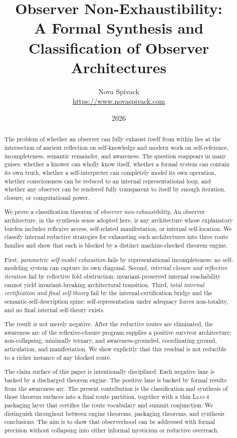 \documentclass[11pt]{article}
\title{Observer Non-Exhaustibility:\\
A Formal Synthesis and Classification of Observer Architectures}
\author{Nova Spivack\\
\url{https://www.novaspivack.com}}
\date{2026}
\theoremstyle{plain}
\theoremstyle{definition}
\theoremstyle{remark}
\newcommand{\Lean}{\textsc{Lean\,4}}
\begin{document}
\maketitle
\NovaZenodoAfterTitle


\begin{abstract}
\raggedright
The problem of whether an observer can fully exhaust itself from within
lies at the intersection of ancient reflection on self-knowledge and
modern work on self-reference, incompleteness, semantic remainder, and
awareness.  The question reappears in many guises: whether a knower can
wholly know itself, whether a formal system can contain its own truth,
whether a self-interpreter can completely model its own operation, whether
consciousness can be reduced to an internal representational loop, and
whether any observer can be rendered fully transparent to itself by
enough iteration, closure, or computational power.

We prove a classification theorem of \emph{observer non-exhaustibility}.
An observer architecture, in the synthesis sense adopted here, is any
architecture whose explanatory burden includes reflexive access,
self-related manifestation, or internal self-location.  We classify
internal reductive strategies for exhausting such architectures into three
route families and show that each is blocked by a distinct
machine-checked theorem engine.

First, \emph{parametric self-model exhaustion} fails by representational
incompleteness: no self-modeling system can capture its own diagonal.
Second, \emph{internal closure and reflective iteration} fail by reflective
fold obstruction: invariant-preserved internal reachability cannot yield
invariant-breaking architectural transition.  Third, \emph{total internal
certification and final self-theory} fail by the internal-certification
bridge and the semantic-self-description spine: self-representation under
adequacy forces non-totality, and no final internal self-theory exists.

The result is not merely negative.  After the reductive routes are
eliminated, the awareness arc of the reflexive-closure program supplies a
positive survivor architecture: non-collapsing, minimally ternary, and
awareness-grounded, coordinating ground, articulation, and manifestation.
We show explicitly that this residual is not reducible to a richer
instance of any blocked route.

The claim surface of this paper is intentionally disciplined.  Each
negative lane is backed by a discharged theorem engine.  The positive lane
is backed by formal results from the awareness arc.  The present
contribution is the classification and synthesis of those theorem surfaces
into a final route partition, together with a thin \Lean{} packaging layer
that certifies the route vocabulary and summit conjunction.  We
distinguish throughout between engine theorems, packaging theorems, and
synthesis conclusions.  The aim is to show that observerhood can be
addressed with formal precision without collapsing into either informal
mysticism or reductive overreach.


\end{abstract}
\end{document}
